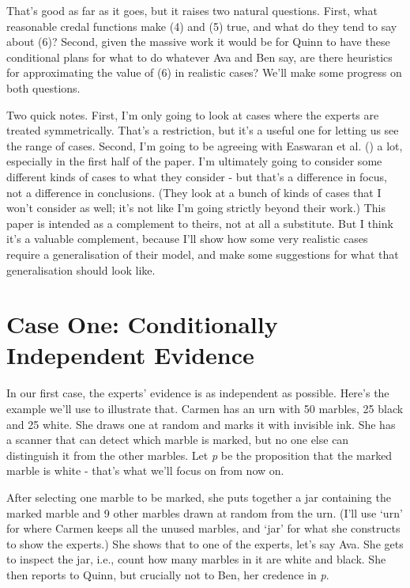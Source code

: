 \documentclass[
  11pt,
  letterpaper,
  DIV=11,
  numbers=noendperiod,
  twoside]{scrartcl}
\begin{document}
That's good as far as it goes, but it raises two natural questions.
First, what reasonable credal functions make (4) and (5) true, and what
do they tend to say about (6)? Second, given the massive work it would
be for Quinn to have these conditional plans for what to do whatever Ava
and Ben say, are there heuristics for approximating the value of (6) in
realistic cases? We'll make some progress on both questions.

Two quick notes. First, I'm only going to look at cases where the
experts are treated symmetrically. That's a restriction, but it's a
useful one for letting us see the range of cases. Second, I'm going to
be agreeing with Easwaran et al. ()
a lot, especially in the first half of the paper. I'm ultimately going
to consider some different kinds of cases to what they consider - but
that's a difference in focus, not a difference in conclusions. (They
look at a bunch of kinds of cases that I won't consider as well; it's
not like I'm going strictly beyond their work.) This paper is intended
as a complement to theirs, not at all a substitute. But I think it's a
valuable complement, because I'll show how some very realistic cases
require a generalisation of their model, and make some suggestions for
what that generalisation should look like.

\section{Case One: Conditionally Independent Evidence}\label{sec-cie}

In our first case, the experts' evidence is as independent as possible.
Here's the example we'll use to illustrate that. Carmen has an urn with
50 marbles, 25 black and 25 white. She draws one at random and marks it
with invisible ink. She has a scanner that can detect which marble is
marked, but no one else can distinguish it from the other marbles. Let
\emph{p} be the proposition that the marked marble is white - that's
what we'll focus on from now on.

After selecting one marble to be marked, she puts together a jar
containing the marked marble and 9 other marbles drawn at random from
the urn. (I'll use `urn' for where Carmen keeps all the unused marbles,
and `jar' for what she constructs to show the experts.) She shows that
to one of the experts, let's say Ava. She gets to inspect the jar, i.e.,
count how many marbles in it are white and black. She then reports to
Quinn, but crucially not to Ben, her credence in \emph{p}.
\end{document}
